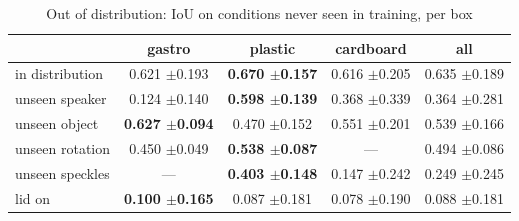 \begin{table}
\caption{Out of distribution: IoU on conditions never seen in training, per box}
\label{tab:ood_iou}
\begin{tabular}{l!{\vrule width 1.2pt}ccc!{\vrule width 1.2pt}c}
\toprule
 & gastro & plastic & cardboard & all \\
\midrule
in distribution & 0.621 {\scriptsize $\pm$0.193} & \bfseries 0.670 {\scriptsize $\pm$0.157} & 0.616 {\scriptsize $\pm$0.205} & 0.635 {\scriptsize $\pm$0.189} \\
unseen speaker & 0.124 {\scriptsize $\pm$0.140} & \bfseries 0.598 {\scriptsize $\pm$0.139} & 0.368 {\scriptsize $\pm$0.339} & 0.364 {\scriptsize $\pm$0.281} \\
unseen object & \bfseries 0.627 {\scriptsize $\pm$0.094} & 0.470 {\scriptsize $\pm$0.152} & 0.551 {\scriptsize $\pm$0.201} & 0.539 {\scriptsize $\pm$0.166} \\
unseen rotation & 0.450 {\scriptsize $\pm$0.049} & \bfseries 0.538 {\scriptsize $\pm$0.087} & — & 0.494 {\scriptsize $\pm$0.086} \\
unseen speckles & — & \bfseries 0.403 {\scriptsize $\pm$0.148} & 0.147 {\scriptsize $\pm$0.242} & 0.249 {\scriptsize $\pm$0.245} \\
lid on & \bfseries 0.100 {\scriptsize $\pm$0.165} & 0.087 {\scriptsize $\pm$0.181} & 0.078 {\scriptsize $\pm$0.190} & 0.088 {\scriptsize $\pm$0.181} \\
\bottomrule
\end{tabular}
\end{table}
